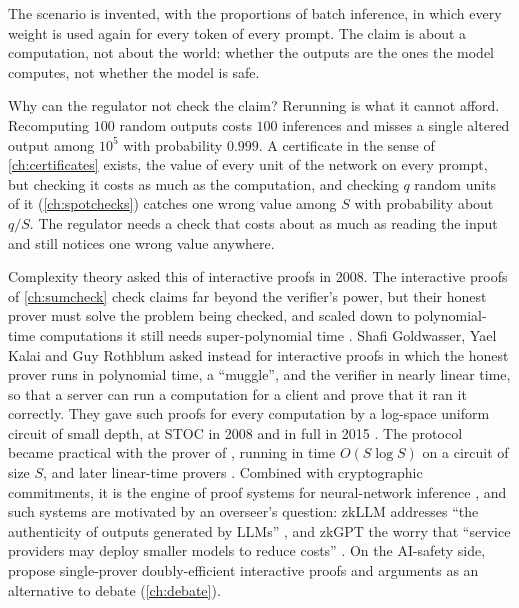 \begin{refsection}
The scenario is invented, with the proportions of batch inference, in which every weight is used again for every token of every prompt. The claim is about a computation, not about the world: whether the outputs are the ones the model computes, not whether the model is safe.

Why can the regulator not check the claim? Rerunning is what it cannot afford. Recomputing $100$ random outputs costs $100$ inferences and misses a single altered output among $10^5$ with probability $0.999$. A certificate in the sense of \cref{ch:certificates} exists, the value of every unit of the network on every prompt, but checking it costs as much as the computation, and checking $q$ random units of it (\cref{ch:spotchecks}) catches one wrong value among $S$ with probability about $q/S$. The regulator needs a check that costs about as much as reading the input and still notices one wrong value anywhere.

Complexity theory asked this of interactive proofs in 2008. The interactive proofs of \cref{ch:sumcheck} check claims far beyond the verifier's power, but their honest prover must solve the problem being checked, and scaled down to polynomial-time computations it still needs super-polynomial time \parencite{GoldwasserKalaiRothblum2015}. Shafi Goldwasser, Yael Kalai and Guy Rothblum asked instead for interactive proofs in which the honest prover runs in polynomial time, a ``muggle'', and the verifier in nearly linear time, so that a server can run a computation for a client and prove that it ran it correctly. They gave such proofs for every computation by a log-space uniform circuit of small depth, at STOC in 2008 and in full in 2015 \parencite{GoldwasserKalaiRothblum2015}. The protocol became practical with the prover of \textcite{CormodeMitzenmacherThaler2012}, running in time $O(S\log S)$ on a circuit of size $S$, and later linear-time provers \parencite{Thaler2013,XieEtAl2019}. Combined with cryptographic commitments, it is the engine of proof systems for neural-network inference \parencite{LiuXieZhang2021,SunLiZhang2024}, and such systems are motivated by an overseer's question: zkLLM addresses ``the authenticity of outputs generated by LLMs'' \parencite{SunLiZhang2024}, and zkGPT the worry that ``service providers may deploy smaller models to reduce costs'' \parencite{QuEtAl2025}. On the AI-safety side, \textcite{ChenKalaiXi2026} propose single-prover doubly-efficient interactive proofs and arguments as an alternative to debate (\cref{ch:debate}).


\end{refsection}
